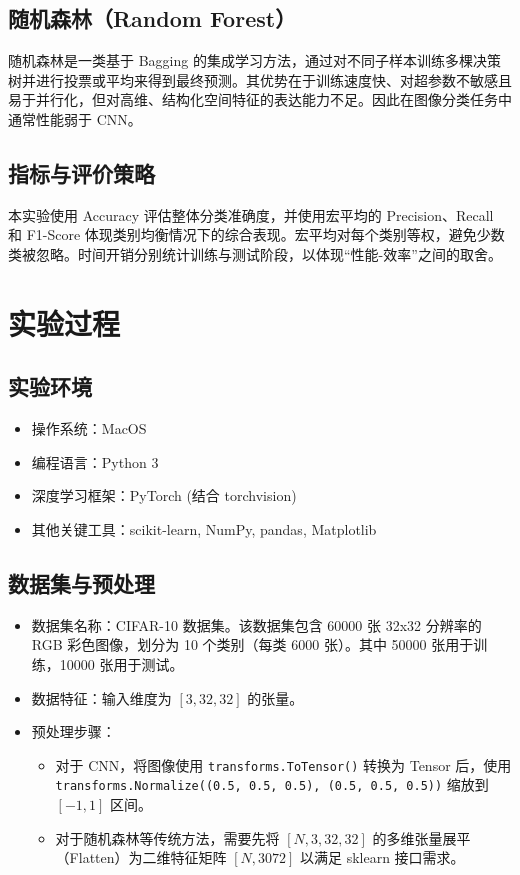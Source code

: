 \documentclass[runningheads]{ctexart}
\begin{document}
\subsection{随机森林（Random Forest）}
随机森林是一类基于 Bagging 的集成学习方法，通过对不同子样本训练多棵决策树并进行投票或平均来得到最终预测。其优势在于训练速度快、对超参数不敏感且易于并行化，但对高维、结构化空间特征的表达能力不足。因此在图像分类任务中通常性能弱于 CNN。

\subsection{指标与评价策略}
本实验使用 Accuracy 评估整体分类准确度，并使用宏平均的 Precision、Recall 和 F1-Score 体现类别均衡情况下的综合表现。宏平均对每个类别等权，避免少数类被忽略。时间开销分别统计训练与测试阶段，以体现“性能-效率”之间的取舍。

\section{实验过程}
\subsection{实验环境}
\begin{itemize}
    \item 操作系统：MacOS
    \item 编程语言：Python 3
    \item 深度学习框架：PyTorch (结合 torchvision)
    \item 其他关键工具：scikit-learn, NumPy, pandas, Matplotlib
\end{itemize}

\subsection{数据集与预处理}
\begin{itemize}
    \item 数据集名称：CIFAR-10 数据集。该数据集包含 60000 张 32x32 分辨率的 RGB 彩色图像，划分为 10 个类别（每类 6000 张）。其中 50000 张用于训练，10000 张用于测试。
    \item 数据特征：输入维度为 $[3, 32, 32]$ 的张量。
    \item 预处理步骤：
    \begin{itemize}
        \item 对于 CNN，将图像使用 \texttt{transforms.ToTensor()} 转换为 Tensor 后，使用 \texttt{transforms.Normalize((0.5, 0.5, 0.5), (0.5, 0.5, 0.5))} 缩放到 \([-1, 1]\) 区间。
        \item 对于随机森林等传统方法，需要先将 $[N, 3, 32, 32]$ 的多维张量展平（Flatten）为二维特征矩阵 $[N, 3072]$ 以满足 sklearn 接口需求。
    \end{itemize}
\end{itemize}
\end{document}
